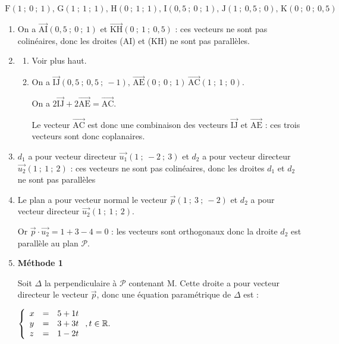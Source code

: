 \documentclass[10pt]{article}
\providecommand{\R}{\mathbb{R}}
\providecommand{\vect}[1]{\overrightarrow{#1}}
\begin{document}
\[\, \text{F}(1~;~0~;~1),\, \text{G}(1~;~1~;~1),\, \text{H}(0~;~1~;~1),\, \text{I}(0,5~;~0~;~1),\, \text{J}(1~;~0,5~;~0),\, \text{K}(0~;~0~;~0,5)\]
\begin{enumerate}
\item 

On a $\vect{\text{AI}}(0,5~;~0~;~1)$ et $\vect{\text{KH}}(0~;~1~;~0,5)$ : ces vecteurs ne sont pas colinéaires, donc les droites (AI) et (KH) ne sont pas parallèles.


\item 
	\begin{enumerate}
		\item 
Voir plus haut.
		\item 
On a $\vect{\text{IJ}}(0,5~;~0,5~;~-1), \, \vect{\text{AE}}(0~;~0~;~1)\, \vect{\text{AC}}(1~;~1~;~0)$.

On a $2\vect{\text{IJ}} + 2\vect{\text{AE}} = \vect{\text{AC}}$.

Le vecteur $\vect{\text{AC}}$ est donc une combinaison des vecteurs $\vect{\text{IJ}}$ et $\vect{\text{AE}}$ : ces trois vecteurs sont donc coplanaires.
	\end{enumerate}

	














\item 

$d_1$ a pour vecteur directeur $\vect{u_1}(1~;~-2~;~3)$ et $d_2$ a pour vecteur directeur $\vect{u_2}(1~;~1~;~2)$ : ces vecteurs ne sont pas colinéaires, donc les droites $d_1$ et $d_2$ ne sont pas parallèles 
\item 

Le plan a pour vecteur normal le vecteur $\vect{p}(1~;~3~;~-2)$ et $d_2$ a pour vecteur directeur $\vect{u_2}(1~;~1~;~2)$.

Or $\vect{p} \cdot \vect{u_2} =  1 + 3 - 4 = 0$ : les vecteurs sont orthogonaux donc la droite $d_2$ est parallèle au plan $\mathcal P$.
\item 
\textbf{Méthode 1}

Soit $\Delta$ la perpendiculaire à $\mathcal P$ contenant M. Cette droite a pour vecteur directeur le vecteur $\vect{p}$, donc une équation paramétrique de $\Delta$ est :

$\left\{\begin{array}{l c l}
x	&=&5 + 1t\\
y 	&=&3 + 3t\\
z	&=&1 - 2t\\
\end{array}\right., t \in \R.$


\end{enumerate}
\end{document}
